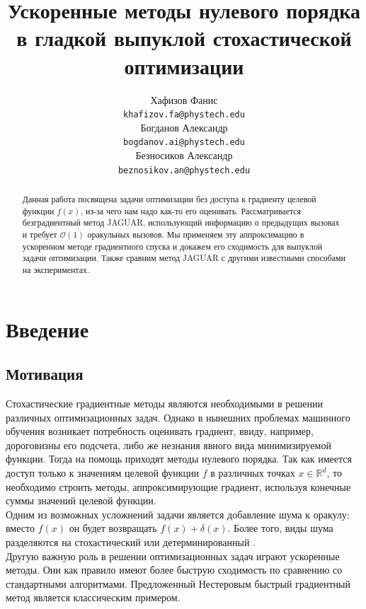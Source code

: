 \documentclass{article}
\title{Ускоренные методы нулевого порядка в гладкой выпуклой стохастической оптимизации}
\author{
	Хафизов Фанис \\
	\texttt{khafizov.fa@phystech.edu} \\
	\And
	Богданов Александр \\
	\texttt{bogdanov.ai@phystech.edu} \\
	\And
	Безносиков Александр \\
	\texttt{beznosikov.an@phystech.edu}
}
\date{}
\newcommand{\R}{\mathbb{R}}
\begin{document}
\maketitle

\begin{abstract}
Данная работа посвящена задачи оптимизации без доступа к градиенту целевой функции $f(x)$, из-за чего нам надо как-то его оценивать. Рассматривается безградиентный метод JAGUAR, использующий информацию о предыдущих вызовах и требует $\mathcal{O}(1)$ оракульных вызовов. Мы применяем эту аппроксимацию в ускоренном методе градиентного спуска и докажем его сходимость для выпуклой задачи оптимизации. Также сравним метод JAGUAR с другими известными способами на экспериментах.

\end{abstract}


\section{Введение}
\subsection{Мотивация}
Стохастические градиентные методы являются необходимыми в решении различных оптимизационных задач. Однако в нынешних проблемах машинного обучения возникает потребность оценивать градиент, ввиду, например, дороговизны его подсчета, либо же незнания явного вида минимизируемой функции. Тогда на помощь приходят методы нулевого порядка. Так как имеется доступ только к значениям целевой функции $f$ в различных точках $x \in \R^d$, то необходимо строить методы, аппроксимирующие градиент, используя конечные суммы значений целевой функции.\\
Одним из возможных усложнений задачи является добавление шума к оракулу: вместо $f(x)$ он будет возвращать $f(x) + \delta (x)$. Более того, виды шума разделяются на стохастический \cite{lucchi2022theoretical} или детерминированный \cite{lobanov2023zeroorder}.\\
Другую важную роль в решении оптимизационных задач играют ускоренные методы. Они как правило имеют более быструю сходимость по сравнению со стандартными алгоритмами. Предложенный Нестеровым \cite{Nesterov1983AMF} быстрый градиентный метод является классическим примером.
\end{document}
